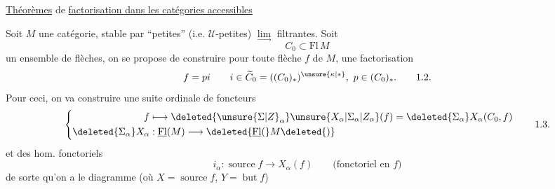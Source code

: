 \uline{Théorèmes} de \uline{factorisation dans les catégories accessibles}


Soit $M$ une catégorie, stable par ``petites'' (i.e. $\mathcal U$-petites) $\underset{\longrightarrow}{\lim}$ filtrantes. Soit
\[C_0\subset\mathrm{Fl}\,M\tag*{1.1.}\]
un  ensemble de flèches, on se propose de construire pour toute flèche $f$ de $M$, une factorisation
\[f=pi\qquad i\in\widetilde C_0=((C_0)_*)^{\unsure{\kappa|*}},\ p\in(C_0)_*.\tag*{1.2.}\]
Pour ceci, on va construire une suite ordinale de foncteurs
\[
\left\{\begin{aligned}
f&\longmapsto\deleted{\unsure{\Sigma|Z}_\alpha}\unsure{X_\alpha|\Sigma_\alpha|Z_\alpha}(f)=\deleted{\Sigma_\alpha}X_\alpha(C_0,f)\\
\deleted{\Sigma_\alpha}X_\alpha&:\underline{\mathrm{Fl}}(M)\longrightarrow\deleted{\underline{\mathrm{Fl}}(}M\deleted{)}
\end{aligned}\right.\tag*{1.3.}
\]
 et des hom. fonctoriels 
\[i_\alpha:\operatorname{source}f\longrightarrow X_\alpha(f)\qquad\text{(fonctoriel en $f$)}\tag*{1.4.}\]
\[\tag*{1.5.}\]
de sorte qu'on a le diagramme (où $X=\operatorname{source}f$, $Y=\operatorname{but}f$)

